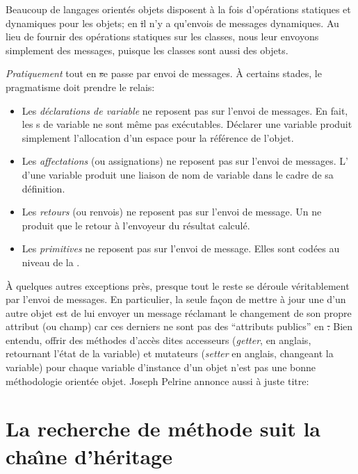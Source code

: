 \documentclass[a4paper,10pt,twoside]{book}
\begin{document}
Beaucoup de langages orient\'es objets disposent \`a la fois d'op\'erations statiques et dynamiques pour les objets; en \st il n'y a qu'envois de messages dynamiques. Au lieu de fournir des op\'erations statiques sur les classes, nous leur envoyons simplement des messages, puisque les classes sont aussi des objets. 

\emph{Pratiquement} tout en \st se passe par envoi de messages.
\`A certains stades, le pragmatisme doit prendre le relais:
\begin{itemize}
  \item Les \emph{d\'eclarations de variable} ne reposent pas sur l'envoi de messages.
  		En fait, les s de variable ne sont m\^eme pas ex\'ecutables.
  		D\'eclarer une variable produit simplement l'allocation d'un espace pour la r\'ef\'erence de l'objet.
  \item Les \emph{affectations} (ou assignations) ne reposent pas sur l'envoi de messages.
  		L' d'une variable produit une liaison de nom de variable dans le cadre de sa d\'efinition.
  \item Les \emph{retours} (ou renvois) ne reposent pas sur l'envoi de message.
  		Un  ne produit que le retour \`a l'envoyeur du r\'esultat calcul\'e.
  \item Les \emph{primitives} ne reposent pas sur l'envoi de message.
  		Elles sont cod\'ees au niveau de la .
\end{itemize}

\`A quelques autres exceptions pr\`es, presque tout le reste se d\'eroule v\'eritablement par l'envoi de messages. 
En particulier, la seule fa\c{c}on de mettre \`a jour une  d'un autre objet est de lui envoyer un message r\'eclamant le changement de son propre attribut (ou champ) car ces derniers ne sont pas des ``attributs publics'' en \st.
Bien entendu, offrir des m\'ethodes d'acc\`es dites accesseurs (\emph{getter}, en anglais, retournant l'\'etat de la variable) et mutateurs (\emph{setter} en anglais, changeant la variable) pour chaque variable d'instance d'un objet n'est pas une bonne m\'ethodologie orient\'ee objet.
Joseph Pelrine annonce aussi \`a juste titre:

\section{La recherche de m\'ethode suit la cha\^{\i}ne d'h\'eritage} 
\end{document}
